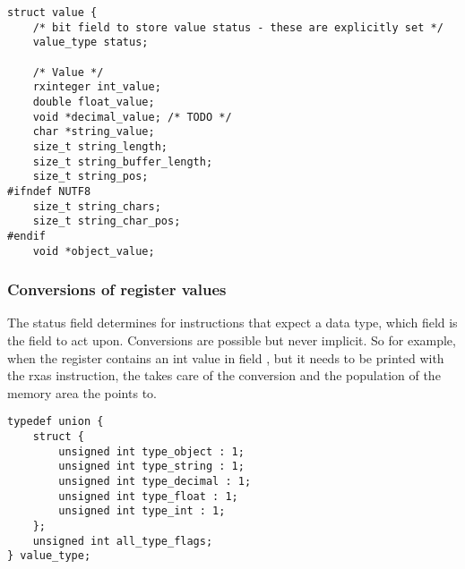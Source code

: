 \begin{lstlisting}[label=crexxregister,caption={The
\crexx{} Register implementation in C}]
struct value {
    /* bit field to store value status - these are explicitly set */
    value_type status;

    /* Value */
    rxinteger int_value;
    double float_value;
    void *decimal_value; /* TODO */
    char *string_value;
    size_t string_length;
    size_t string_buffer_length;
    size_t string_pos;
#ifndef NUTF8
    size_t string_chars;
    size_t string_char_pos;
#endif
    void *object_value;
\end{lstlisting}

\subsubsection{Conversions of register values}
The status field determines for instructions that expect a data type,
which field is the field to act upon. Conversions are possible but
never implicit. So for example, when the register contains an int
value in field , but it needs to be printed with the rxas
 instruction, the
 takes care of the conversion and the population of the
memory area the  points to. 

\begin{lstlisting}[label=crexxregister,caption={Values of
the Status field}]
typedef union {
    struct {
        unsigned int type_object : 1;
        unsigned int type_string : 1;
        unsigned int type_decimal : 1;
        unsigned int type_float : 1;
        unsigned int type_int : 1;
    };
    unsigned int all_type_flags;
} value_type;
\end{lstlisting}

